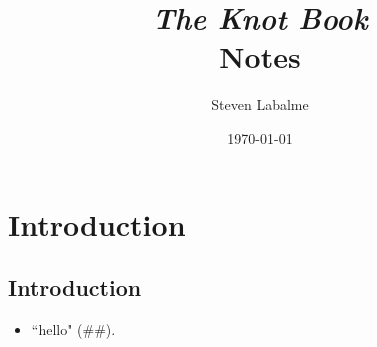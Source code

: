 \documentclass[titlepage]{article}
\title{{\Huge\emph{The Knot Book}}\\[5pt]\textcolor{gray!60!black}{Notes}\vspace{-0.5em}}
\author{Steven Labalme}
\date{\today}
\newcommand{\dq}[2]{``#1" (#2).}
\begin{document}
\maketitle



\tableofcontents
\listoffigures
\listoftables
\newpage



\pagestyle{fancy}
\fancyhf{}
\renewcommand{\headrulewidth}{0pt}
\section{Introduction}
\subsection{Introduction}
\begin{itemize}
    \item \dq{hello}{\#\#}
\end{itemize}
\end{document}
